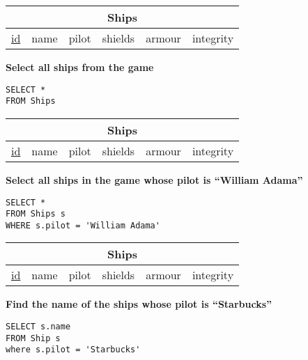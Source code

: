 \documentclass{beamer}
\begin{document}
\begin{frame}[fragile]
\begin{tabular}{|c|c|c|c|c|c|}
\hline
\multicolumn{6}{|c|}{\textbf{Ships}} \\
\hline
\underline{id} & name & pilot & shields & armour & integrity \\
\hline
\end{tabular}

\vspace{0.25cm}
\textbf{Select all ships from the game}
\pause
\begin{lstlisting}
SELECT *
FROM Ships
\end{lstlisting}

\end{frame}

\begin{frame}[fragile]
\begin{tabular}{|c|c|c|c|c|c|}
\hline
\multicolumn{6}{|c|}{\textbf{Ships}} \\
\hline
\underline{id} & name & pilot & shields & armour & integrity \\
\hline
\end{tabular}

\vspace{0.25cm}
\textbf{Select all ships in the game whose pilot is ``William Adama''}
\pause
\begin{lstlisting}
SELECT *
FROM Ships s
WHERE s.pilot = 'William Adama'
\end{lstlisting}

\end{frame}

\begin{frame}[fragile]
\begin{tabular}{|c|c|c|c|c|c|}
\hline
\multicolumn{6}{|c|}{\textbf{Ships}} \\
\hline
\underline{id} & name & pilot & shields &  armour & integrity \\
\hline
\end{tabular}

\vspace{0.25cm}
\textbf{Find the name of the ships whose pilot is ``Starbucks''}
\pause
\begin{lstlisting}
SELECT s.name
FROM Ship s
where s.pilot = 'Starbucks'
\end{lstlisting}

\end{frame}
\end{document}
